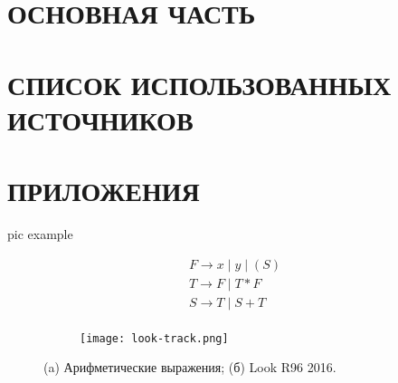 \documentclass[oneside,a4paper,14pt,final]{extreport}
\begin{document}

\thispagestyle{empty} %

{\linespread{0.9}\tableofcontents}


{\CenterChapterHeading\chapter*{ОСНОВНАЯ ЧАСТЬ}
\newpage
}




\chapter{СПИСОК ИСПОЛЬЗОВАННЫХ ИСТОЧНИКОВ}
\begingroup
\let\clearpage\relax
\printbibliography[category=SourcesGOST, title=""]
\vspace{-1.5cm}
\printbibliography[notcategory=SourcesGOST, title=""]
\endgroup
{\CenterChapterHeading\chapter*{ПРИЛОЖЕНИЯ}
\newpage
}


pic example
\begin{figure}[ht]
\centering
    \begin{subfigure}[b]{0.3\textwidth}
    \centering
        $$\begin{array}{l}
        F \to x \;|\; y \;|\; (S) \\
        T \to F \;|\; T \ast F \\
        S \to T \;|\; S + T \\
        \end{array}$$
        \caption{}
    \end{subfigure} %
    \begin{subfigure}[b]{0.6\textwidth}
    \centering
        \texttt{[image: look-track.png]}
        \caption{}
    \end{subfigure}

    \caption{(a) Арифметические выражения;
             (б) Look R96 2016.}
    \label{fig_parsetree}
\end{figure}
\end{document}
